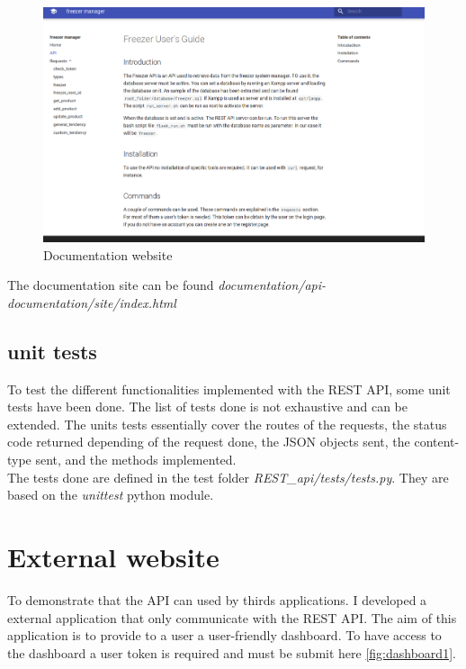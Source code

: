 \begin{figure}[H]
\centering
\includegraphics[scale=0.25]{./images/documentation.png}
\caption{Documentation website}
\label{fig:adminPanel}
\end{figure}

The documentation site can be found \textit{documentation/api-documentation/site/index.html}

\subsection{unit tests}
To test the different functionalities implemented with the REST API, some unit tests have been done. The list of tests done is not exhaustive and can be extended. The units tests essentially cover the routes of the requests, the status code returned depending of the request done, the JSON objects sent, the content-type sent, and the methods implemented.\\

The tests done are defined in the test folder \textit{REST\_api/tests/tests.py}. They are based on the \textit{unittest} python module.

\section{External website}
To demonstrate that the API can used by thirds applications. I developed a external application that only communicate with the REST API. The aim of this application is to provide to a user a user-friendly dashboard. To have access to the dashboard a user token is required and must be submit here \autoref{fig:dashboard1}.

